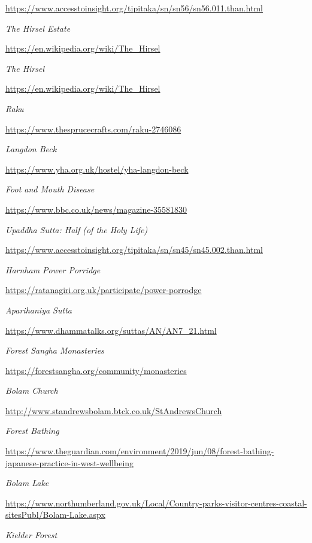 \begin{thebibliography}{9}
  {\urlsize \url{https://www.accesstoinsight.org/tipitaka/sn/sn56/sn56.011.than.html}}

 \emph{The Hirsel Estate}

  {\urlsize \url{https://en.wikipedia.org/wiki/The_Hirsel}}

 \emph{The Hirsel}

  {\urlsize \url{https://en.wikipedia.org/wiki/The_Hirsel}}

 \emph{Raku}

  {\urlsize \url{https://www.thesprucecrafts.com/raku-2746086}}

 \emph{Langdon Beck}

  {\urlsize \url{https://www.yha.org.uk/hostel/yha-langdon-beck}}

 \emph{Foot and Mouth Disease}

  {\urlsize \url{https://www.bbc.co.uk/news/magazine-35581830}}

 \emph{Upaddha Sutta: Half (of the Holy Life)}

  {\urlsize \url{https://www.accesstoinsight.org/tipitaka/sn/sn45/sn45.002.than.html}}

 \emph{Harnham Power Porridge}

  {\urlsize \url{https://ratanagiri.org.uk/participate/power-porrodge}}

 \emph{Aparihaniya Sutta}

  {\urlsize \url{https://www.dhammatalks.org/suttas/AN/AN7_21.html}}

 \emph{Forest Sangha Monasteries}

  {\urlsize \url{https://forestsangha.org/community/monasteries}}

 \emph{Bolam Church}

  {\urlsize \url{http://www.standrewsbolam.btck.co.uk/StAndrewsChurch}}

 \emph{Forest Bathing}

  {\urlsize \url{https://www.theguardian.com/environment/2019/jun/08/forest-bathing-japanese-practice-in-west-wellbeing}}

 \emph{Bolam Lake}

  {\urlsize \url{https://www.northumberland.gov.uk/Local/Country-parks-visitor-centres-coastal-sitesPubl/Bolam-Lake.aspx}}

 \emph{Kielder Forest}


\end{thebibliography}
